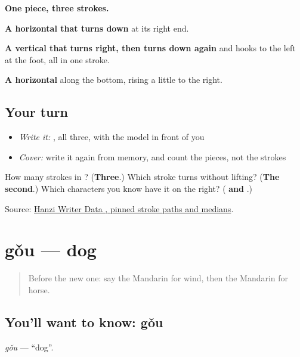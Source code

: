 \begin{quote}
\end{quote}

\textbf{One piece, three strokes.}

\textbf{A horizontal that turns down} at its right end.

\textbf{A vertical that turns right, then turns down again} and hooks to the left at the foot, all in one stroke.

\textbf{A horizontal} along the bottom, rising a little to the right.

\subsection*{Your turn}
\begin{itemize}
\raggedright
  \item \emph{Write it:} , all three, with the model in front of you
  \item \emph{Cover:} write it again from memory, and count the pieces, not the strokes
\end{itemize}

\begin{tcolorbox}[breakable,colback=teal!4,colframe=teal!35!black,title={Before you move on}]
How many strokes in ? (\textbf{Three}.) Which stroke turns without lifting? (\textbf{The second}.) Which characters you know have it on the right? (\textbf{ and }.)

Source: \href{https://raw.githubusercontent.com/chanind/hanzi-writer-data/68d10a4b21150cae5e1ebbd223eed289cf32d90c/data/\%E9\%A9\%AC.json}{Hanzi Writer Data , pinned stroke paths and medians}.
\end{tcolorbox}
\section[gǒu]{gǒu — dog}

\label{lesson:ZH-C67-gou}



\begin{quote}
Before the new one: say the Mandarin for wind, then the Mandarin for horse.
\end{quote}

\subsection*{You'll want to know: gǒu}
\emph{gǒu} — \textquotedblleft{}dog\textquotedblright{}.

